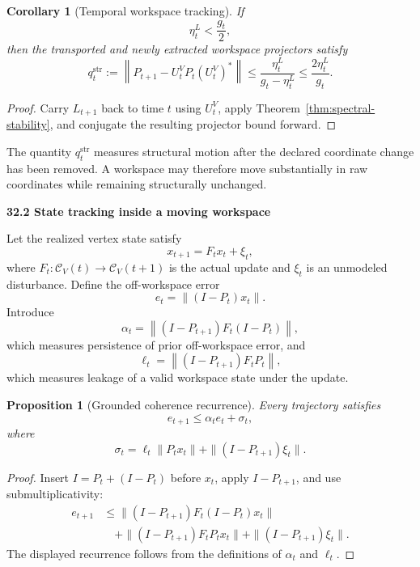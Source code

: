 \documentclass[11pt,letterpaper]{article}
\newcommand{\subtopic}[1]{%
 \vspace{0.45em}
 {\bfseries\color{AccentColor} #1\par}
}
\theoremstyle{plain}
\newtheorem{proposition}[theorem]{Proposition}
\newtheorem{corollary}[theorem]{Corollary}
\theoremstyle{definition}
\begin{document}
\begin{corollary}[Temporal workspace tracking]\label{cor:temporal-workspace-tracking}
If
\[
\eta_t^L<\frac{g_t}{2},
\]
then the transported and newly extracted workspace projectors satisfy
\[
\boxed{
q_t^{\mathrm{str}}
:=
\left\|
P_{t+1}-U_t^VP_t(U_t^V)^*
\right\|
\leq
\frac{\eta_t^L}{g_t-\eta_t^L}
\leq
\frac{2\eta_t^L}{g_t}.
}
\]
\end{corollary}

\begin{proof}
Carry \(L_{t+1}\) back to time \(t\) using \(U_t^V\), apply
Theorem~\ref{thm:spectral-stability}, and conjugate the resulting projector
bound forward.
\end{proof}

The quantity \(q_t^{\mathrm{str}}\) measures structural motion after the
declared coordinate change has been removed. A workspace may therefore move
substantially in raw coordinates while remaining structurally unchanged.

\subtopic{32.2 State tracking inside a moving workspace}

Let the realized vertex state satisfy
\[
x_{t+1}=F_tx_t+\xi_t,
\]
where \(F_t:\mathcal C_V(t)\to\mathcal C_V(t+1)\) is the actual update and
\(\xi_t\) is an unmodeled disturbance. Define the off-workspace error
\[
\boxed{
e_t=\|(I-P_t)x_t\|.
}
\]
Introduce
\[
\alpha_t
=
\left\|
(I-P_{t+1})F_t(I-P_t)
\right\|,
\]
which measures persistence of prior off-workspace error, and
\[
\ell_t
=
\left\|
(I-P_{t+1})F_tP_t
\right\|,
\]
which measures leakage of a valid workspace state under the update.

\begin{proposition}[Grounded coherence recurrence]\label{prop:grounded-coherence-recurrence}
Every trajectory satisfies
\[
\boxed{
e_{t+1}\leq\alpha_te_t+\sigma_t,}
\]
where
\[
\boxed{
\sigma_t
=
\ell_t\|P_tx_t\|
+
\|(I-P_{t+1})\xi_t\|.
}
\]
\end{proposition}

\begin{proof}
Insert \(I=P_t+(I-P_t)\) before \(x_t\), apply \(I-P_{t+1}\), and use
submultiplicativity:
\[
\begin{aligned}
e_{t+1}
&\leq
\|(I-P_{t+1})F_t(I-P_t)x_t\|\\
&\quad+
\|(I-P_{t+1})F_tP_tx_t\|
+
\|(I-P_{t+1})\xi_t\|.
\end{aligned}
\]
The displayed recurrence follows from the definitions of \(\alpha_t\) and
\(\ell_t\).
\end{proof}
\end{document}
